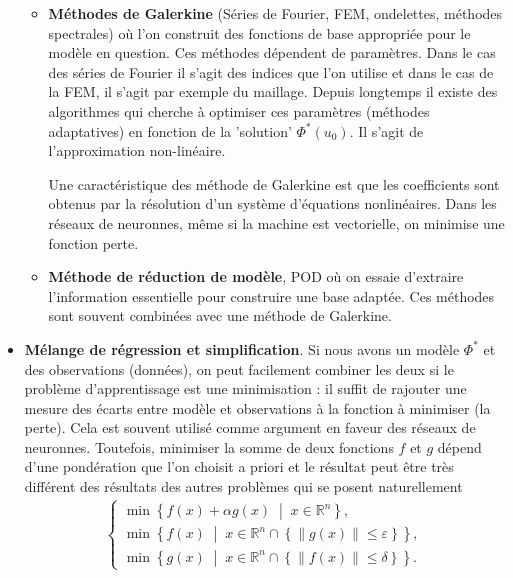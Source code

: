 \documentclass[11pt,a4paper]{article}
\newcommand{\R}{\mathbb R}
\newcommand{\eps}{\varepsilon}
\newcommand{\norm}[1]{\|#1\|}
\newcommand{\Set}[1]{\left\{#1\right\}}
\newcommand{\SetDef}[2]{\left\{#1\;\middle|\;#2\right\}}
\begin{document}
\begin{itemize}
\begin{itemize}
%
\item \textbf{Méthodes de Galerkine} (Séries de Fourier, FEM, ondelettes, méthodes spectrales) où l'on construit des fonctions de base appropriée pour le modèle en question. Ces méthodes dépendent de paramètres. Dans le cas des séries de Fourier il s'agit des indices que l'on utilise et dans le cas de la FEM, il s'agit par exemple du maillage. Depuis longtemps il existe des algorithmes qui cherche à optimiser ces paramètres (méthodes adaptatives) en fonction de la 'solution' $\Phi^*(u_0)$. Il s'agit de l'approximation non-linéaire. 

Une caractéristique des méthode de Galerkine est que les coefficients sont obtenus par la résolution d'un système d'équations nonlinéaires.
Dans les réseaux de neuronnes, même si la machine est vectorielle, on minimise une fonction perte.  
%
\item \textbf{Méthode de réduction de modèle}, POD où on essaie d'extraire l'information essentielle pour construire une base adaptée. Ces méthodes sont souvent combinées avec une méthode de Galerkine.
\end{itemize}
%
\item \textbf{Mélange de régression et simplification}. Si nous avons un modèle $\Phi^*$ et des observations (données), on peut facilement combiner les deux si le problème d'apprentissage est une minimisation : il suffit de rajouter une mesure des écarts entre modèle et observations à la fonction à minimiser (la perte). Cela est souvent utilisé comme argument en faveur des réseaux de neuronnes. 
Toutefois, minimiser la somme de deux fonctions $f$ et $g$ dépend d'une pondération que l'on choisit a priori et le résultat peut être très différent des résultats des autres problèmes qui se posent naturellement
\begin{align*}
\left\{
\begin{aligned}
\min\SetDef{f(x)+\alpha g(x)}{x\in\R^n},\\ 
\min\SetDef{f(x)}{x\in\R^n\cap\Set{\norm{g(x)}\le \eps}},\\
\min\SetDef{g(x)}{x\in\R^n\cap\Set{\norm{f(x)}\le \delta}}.
\end{aligned}
\right.
\end{align*}
\end{itemize}
%
\end{document}

